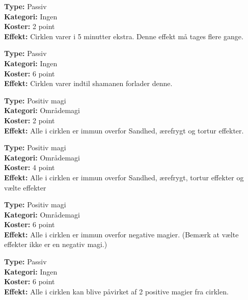 \begin{ritual*}
\textbf{Type:} Passiv\\
\textbf{Kategori:} Ingen\\
\textbf{Koster:} 2 point\\
\textbf{Effekt:} Cirklen varer i 5 minutter ekstra. Denne effekt må tages flere gange.
\end{ritual*}

\begin{ritual*}
\textbf{Type:} Passiv\\
\textbf{Kategori:} Ingen\\
\textbf{Koster:} 6 point\\
\textbf{Effekt:} Cirklen varer indtil shamanen forlader denne.
\end{ritual*}

\begin{ritual*}[Immun 1]
\textbf{Type:} Positiv magi\\
\textbf{Kategori:} Områdemagi\\
\textbf{Koster:} 2 point\\
\textbf{Effekt:} Alle i cirklen er immun overfor Sandhed, ærefrygt og tortur effekter.
\end{ritual*}

\begin{ritual*}[Immun 2]
\textbf{Type:} Positiv magi\\
\textbf{Kategori:} Områdemagi\\
\textbf{Koster:} 4 point\\
\textbf{Effekt:} Alle i cirklen er immun overfor Sandhed, ærefrygt, tortur effekter og vælte effekter
\end{ritual*}

\begin{ritual*}[Immun 3]
\textbf{Type:} Positiv magi\\
\textbf{Kategori:} Områdemagi\\
\textbf{Koster:} 6 point\\
\textbf{Effekt:} Alle i cirklen er immun overfor negative magier. (Bemærk at vælte effekter ikke er en negativ magi.)
\end{ritual*}

\begin{ritual*}
\textbf{Type:} Passiv\\
\textbf{Kategori:} Ingen\\
\textbf{Koster:} 6 point\\
\textbf{Effekt:} Alle i cirklen kan blive påvirket af 2 positive magier fra cirklen.
\end{ritual*}

